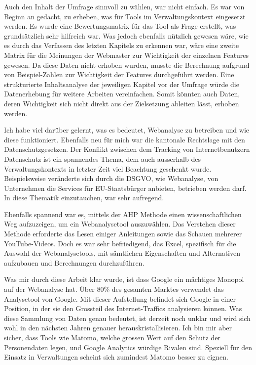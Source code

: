 Auch den Inhalt der Umfrage sinnvoll zu wählen, war nicht einfach. Es war von Beginn an gedacht, zu erheben, was für Tools im Verwaltungskontext eingesetzt werden. Es wurde eine Bewertungsmatrix für das Tool als Frage erstellt, was grundsätzlich sehr hilfreich war. Was jedoch ebenfalls nützlich gewesen wäre, wie es durch das Verfassen des letzten Kapitels zu erkennen war, wäre eine zweite Matrix für die Meinungen der Webmaster zur Wichtigkeit der einzelnen Features gewesen. Da diese Daten nicht erhoben wurden, musste die Berechnung aufgrund von Beispiel-Zahlen zur Wichtigkeit der Features durchgeführt werden. Eine strukturierte Inhaltsanalyse der jeweiligen Kapitel vor der Umfrage würde die Datenerhebung für weitere Arbeiten vereinfachen. Somit könnten auch Daten, deren Wichtigkeit sich nicht direkt aus der Zielsetzung ableiten lässt, erhoben werden.

Ich habe viel darüber gelernt, was es bedeutet, Webanalyse zu betreiben und wie diese funktioniert. Ebenfalls neu für mich war die kantonale Rechtslage mit den Datenschutzgesetzen. Der Konflikt zwischen dem Tracking von Internetbenutzern Datenschutz ist ein spannendes Thema, dem auch ausserhalb des Verwaltungskontexts in letzter Zeit viel Beachtung geschenkt wurde. Beispielsweise veränderte sich durch die DSGVO, wie Webanalyse, von Unternehmen die Services für EU-Staatsbürger anbieten, betrieben werden darf. In diese Thematik einzutauchen, war sehr aufregend. 

Ebenfalls spannend war es, mittels der AHP Methode einen wissenschaftlichen Weg aufzuzeigen, um ein Webanalysetool auszuwählen. Das Verstehen dieser Methode erforderte das Lesen einiger Anleitungen sowie das Schauen mehrerer YouTube-Videos. Doch es war sehr befriedigend, das Excel, spezifisch für die Auswahl der Webanalysetools, mit sämtlichen Eigenschaften und Alternativen aufzubauen und Berechnungen durchzuführen.

Was mir durch diese Arbeit klar wurde, ist dass Google ein mächtiges Monopol auf der Webanalyse hat. Über 80\% des gesamten Marktes verwendet das Analysetool von Google. Mit dieser Aufstellung befindet sich Google in einer Position, in der sie den Grossteil des Internet-Traffics analysieren können. Was diese Sammlung von Daten genau bedeutet, ist derzeit noch unklar und wird sich wohl in den nächsten Jahren genauer herauskristallisieren. Ich bin mir aber sicher, dass Tools wie Matomo, welche grossen Wert auf den Schutz der Personendaten legen, und Google Analytics würdige Rivalen sind. Speziell für den Einsatz in Verwaltungen scheint sich zumindest Matomo besser zu eignen.



